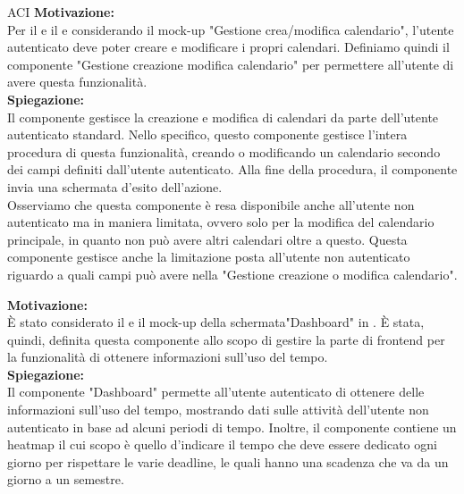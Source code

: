 \begin{listaPersonale}{ACI}
    \textbf{Motivazione:}\\
    Per il  e il  e considerando il mock-up  "Gestione crea/modifica calendario", l'utente autenticato deve poter creare e modificare i propri calendari.
    Definiamo quindi il componente "Gestione creazione modifica calendario" per permettere all'utente di avere questa funzionalità.\\
    \textbf{Spiegazione:} \\Il componente gestisce la creazione e modifica di calendari da parte dell'utente autenticato standard. Nello specifico, questo componente gestisce l'intera procedura di questa funzionalità, creando o modificando un calendario secondo dei campi definiti dall'utente autenticato. Alla fine della procedura, il componente invia una schermata d'esito dell'azione.\\
    Osserviamo che questa componente è resa disponibile anche all'utente non autenticato ma in maniera limitata, ovvero solo per la modifica del calendario principale, in quanto non può avere altri calendari oltre a questo. Questa componente gestisce anche la limitazione posta all'utente non autenticato riguardo a quali campi può avere nella "Gestione creazione o modifica calendario".


    \textbf{Motivazione:}\\
    È stato considerato il  e il mock-up della schermata"Dashboard" in . È stata, quindi, definita questa componente allo scopo di gestire la parte di frontend per la funzionalità di ottenere informazioni sull'uso del tempo.\\
    \textbf{Spiegazione:}\\
    Il componente "Dashboard" permette all'utente autenticato di ottenere delle informazioni sull'uso del tempo,  mostrando dati sulle attività dell'utente non autenticato in base ad alcuni periodi di tempo. Inoltre, il componente contiene un heatmap  il cui scopo è quello d'indicare il tempo che deve essere dedicato ogni giorno per rispettare le varie deadline, le quali hanno una scadenza che va da un giorno a un semestre.



\end{listaPersonale}
